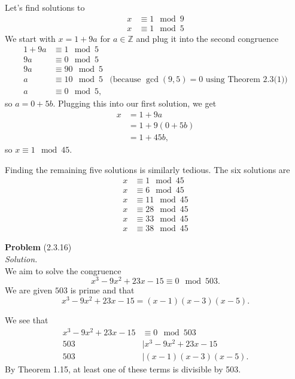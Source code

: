 \documentclass[12 pt]{amsart}
\begin{document}
  Let's find solutions to 
  \begin{align*}
    x &\equiv 1 \mod 9 \\
    x &\equiv 1 \mod 5
  \end{align*}
  We start with $x = 1 + 9a$ for $a \in \mathbb{Z}$
  and plug it into the second congruence
  \begin{align*}
    1 + 9a &\equiv 1 \mod 5 \\
    9a &\equiv 0 \mod 5 \\
    9a &\equiv 90 \mod 5 \\
    a &\equiv 10 \mod 5  
      & \text{(because $\gcd(9, 5) = 0$ using Theorem 2.3(1))} \\ 
    a &\equiv 0 \mod 5, 
  \end{align*}
  so $a = 0 + 5b$. 
  Plugging this into our first solution, we get
  \begin{align*}
    x &= 1 + 9a \\
      &= 1 + 9(0 + 5b) \\
      &= 1 + 45b,
  \end{align*}
  so $x \equiv 1 \mod 45$. 

  Finding the remaining five solutions is similarly tedious.
  The six solutions are 
  \begin{align*}
    x &\equiv 1 \mod 45 \\
    x &\equiv 6 \mod 45 \\
    x &\equiv 11 \mod 45 \\
    x &\equiv 28 \mod 45 \\
    x &\equiv 33 \mod 45 \\
    x &\equiv 38 \mod 45
  \end{align*}
\vfill
\newpage



\phantom{\quad} \vfill
\noindent
\textbf{Problem} (2.3.16) \\[4ex]
\emph{Solution.} \\[2ex]
  We aim to solve the congruence 
  \[
    x^3 - 9x^2 + 23x - 15 \equiv 0 \mod 503.
  \]
  We are given $503$ is prime and that
  \[
    x^3 - 9x^2 + 23x - 15 = (x-1)(x-3)(x-5).
  \]

  We see that 
  \begin{align*}
    x^3 - 9x^2 + 23x - 15 &\equiv 0 \mod 503 \\
    503 &\mid x^3 - 9x^2 + 23x - 15 \\
    503 &\mid (x-1)(x-3)(x-5).
  \end{align*}
  By Theorem 1.15, at least one of these terms is 
  divisible by 503. 
\end{document}
